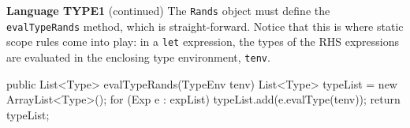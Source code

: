 \begin{minipage}[t]{\sw}
\slidenumber
\LARGE
{\bf Language TYPE1} (continued)\exx
\Large
\Large
The \verb'Rands' object must define
the \verb'evalTypeRands' method, which is straight-forward.
Notice that this is where static scope rules come into play:
in a \verb'let' expression, the types of the RHS expressions
are evaluated in the enclosing type environment, \verb'tenv'.
\begin{qv}
public List<Type> evalTypeRands(TypeEnv tenv) {
    List<Type> typeList = new ArrayList<Type>();
    for (Exp e : expList)
        typeList.add(e.evalType(tenv));
    return typeList;
}
\end{qv}
        
\end{minipage}
